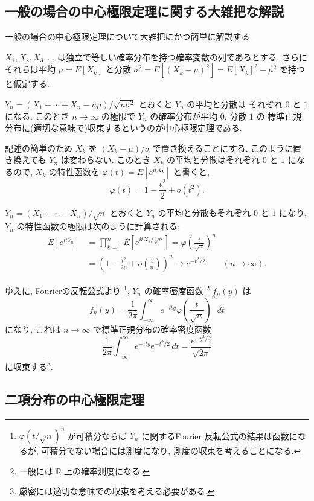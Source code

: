 \documentclass[12pt,twoside]{jarticle}
\newcommand\R{{\mathbb R}} %
\theoremstyle{jplain}
\theoremstyle{jplain}
\theoremstyle{jplain}
\numberwithin{theorem}{section}
\numberwithin{equation}{section}
\numberwithin{figure}{section}
\numberwithin{table}{section}
\begin{document}

\subsection{一般の場合の中心極限定理に関する大雑把な解説}

一般の場合の中心極限定理について大雑把にかつ簡単に解説する.

$X_1,X_2,X_3,\ldots$ は独立で等しい確率分布を持つ確率変数の列であるとする.
さらにそれらは平均 $\mu=E[X_k]$ と分散 $\sigma^2=E[(X_k-\mu)^2]=E[X_k]^2-\mu^2$
を持つと仮定する.

$Y_n=(X_1+\cdots+X_n-n\mu)/\sqrt{n\sigma^2}$ とおくと $Y_n$ の平均と分散は
それぞれ $0$ と $1$ になる.
このとき $n\to\infty$ の極限で $Y_n$ の確率分布が平均 $0$, 分散 $1$ の
標準正規分布に(適切な意味で)収束するというのが中心極限定理である.

記述の簡単のため $X_k$ を $(X_k-\mu)/\sigma$ で置き換えることにする.
このように置き換えても $Y_n$ は変わらない.
このとき $X_k$ の平均と分散はそれぞれ $0$ と $1$ になるので,
$X_k$ の特性函数を $\varphi(t)=E[e^{itX_k}]$ と書くと,
\[
\varphi(t) = 1 - \frac{t^2}{2} + o(t^2).
\]

$Y_n=(X_1+\cdots+X_n)/\sqrt{n}$ とおくと
$Y_n$ の平均と分散もそれぞれ $0$ と $1$ になり,
$Y_n$ の特性函数の極限は次のように計算される:
\begin{align*}
E[e^{itY_n}]
&=\prod_{k=1}^n E[e^{itX_k/\sqrt{n}}]
=\varphi\left(\frac{t}{\sqrt{n}}\right)^n
\\ &
=\left( 1 - \frac{t^2}{2n} + o\left(\frac{1}{n}\right) \right)^n
\longrightarrow e^{-t^2/2}
\qquad (n\to\infty).
\end{align*}

ゆえに, Fourierの反転公式より%
\footnote{$\varphi(t/\sqrt{n})^n$ が可積分ならば
$Y_n$ に関するFourier 反転公式の結果は函数になるが,
可積分でない場合には測度になり, 測度の収束を考えることになる.},
$Y_n$ の確率密度函数%
\footnote{一般には $\R$ 上の確率測度になる.}
$f_n(y)$ は
\[
f_n(y)
= \frac{1}{2\pi}\int_{-\infty}^\infty
  e^{-ity}\varphi\left(\frac{t}{\sqrt{n}}\right)^n\,dt
\]
になり, これは $n\to\infty$ で標準正規分布の確率密度函数
\[
\frac{1}{2\pi}\int_{-\infty}^\infty e^{-ity}e^{-t^2/2}\,dt
=\frac{e^{-y^2/2}}{\sqrt{2\pi}}
\]
に収束する\footnote{厳密には適切な意味での収束を考える必要がある.}.


\subsection{二項分布の中心極限定理}
\end{document}
